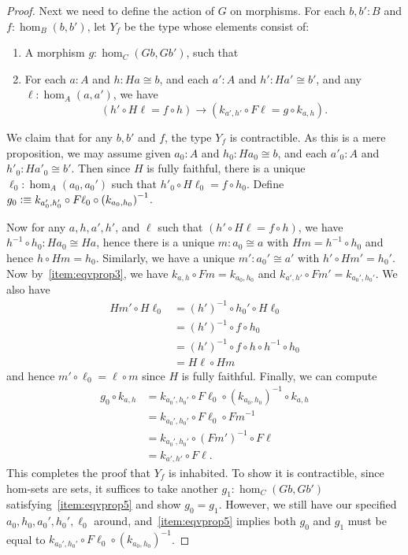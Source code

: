 \documentclass[10pt,a4paper]{article}
\newcommand{\defeq}{\vcentcolon\equiv}  %
\newcommand{\inv}[1]{{#1}^{-1}}
\theoremstyle{definition}
\theoremstyle{remark}
\numberwithin{equation}{section}
\begin{document}
\begin{proof}
  Next we need to define the action of $G$ on morphisms.
  For each $b,b':B$ and $f:\hom_B(b,b')$, let $Y_f$ be the type whose elements consist of:
  \begin{enumerate}[resume]
  \item A morphism $g:\hom_C(Gb,Gb')$, such that
  \item For each $a:A$ and $h:Ha\cong b$, and each $a':A$ and $h':Ha'\cong b'$, and any $\ell:\hom_A(a,a')$, we have\label{item:eqvprop5}
    \[ (h' \circ H\ell = f \circ h)
    \to
    (k_{a',h'} \circ F\ell = g\circ k_{a,h}). \]
  \end{enumerate}
  We claim that for any $b,b'$ and $f$, the type $Y_f$ is contractible.
  As this is a mere proposition, we may assume given $a_0:A$ and $h_0:Ha_0\cong b$, and each $a'_0:A$ and $h'_0:Ha'_0\cong b'$.
  Then since $H$ is fully faithful, there is a unique $\ell_0:\hom_A(a_0,a_0')$ such that $h'_0 \circ H\ell_0 = f \circ h_0$.
  Define $g_0 \defeq k_{a_0',h_0'} \circ F \ell_0 \circ \inv{(k_{a_0,h_0})}$.

  Now for any $a,h,a',h'$, and $\ell$ such that $(h' \circ H\ell = f \circ h)$, we have $\inv{h}\circ h_0:Ha_0\cong Ha$, hence there is a unique $m:a_0\cong a$ with $Hm = \inv{h}\circ h_0$ and hence $h\circ Hm = h_0$.
  Similarly, we have a unique $m':a_0'\cong a'$ with $h'\circ Hm' = h_0'$.
  Now by~\ref{item:eqvprop3}, we have $k_{a,h}\circ Fm = k_{a_0,h_0}$ and $k_{a',h'}\circ Fm' = k_{a_0',h_0'}$.
  We also have
  \begin{align*}
    Hm' \circ H\ell_0
    &= \inv{(h')} \circ h_0' \circ H\ell_0\\
    &= \inv{(h')} \circ f \circ h_0\\
    &= \inv{(h')} \circ f \circ h \circ \inv{h} \circ h_0\\
    &= H\ell \circ Hm
  \end{align*}
  and hence $m'\circ \ell_0 = \ell\circ m$ since $H$ is fully faithful.
  Finally, we can compute
  \begin{align*}
    g_0 \circ k_{a,h}
    &= k_{a_0',h_0'} \circ F \ell_0 \circ \inv{(k_{a_0,h_0})} \circ k_{a,h}\\
    &= k_{a_0',h_0'} \circ F \ell_0 \circ \inv{Fm}\\
    &= k_{a_0',h_0'} \circ \inv{(Fm')} \circ F\ell\\
    &= k_{a',h'}\circ F\ell.
  \end{align*}
  This completes the proof that $Y_f$ is inhabited.
  To show it is contractible, since hom-sets are sets, it suffices to take another $g_1:\hom_C(Gb,Gb')$ satisfying~\ref{item:eqvprop5} and show $g_0=g_1$.
  However, we still have our specified $a_0,h_0,a_0',h_0',\ell_0$ around, and~\ref{item:eqvprop5} implies both $g_0$ and $g_1$ must be equal to $k_{a_0',h_0'} \circ F \ell_0 \circ \inv{(k_{a_0,h_0})}$.


\end{proof}
\end{document}

